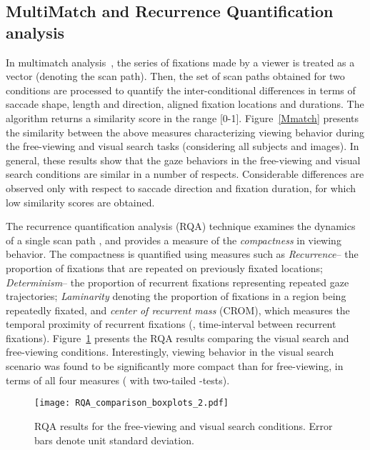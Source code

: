 \documentclass{article}
\begin{document}
\subsection{MultiMatch and Recurrence Quantification analysis}
In multimatch analysis~\cite{Dewhurst}, the series of fixations made by a viewer is treated as a vector (denoting the scan path). Then, the set of scan paths obtained for two conditions are processed to quantify the inter-conditional differences in terms of saccade shape, length and direction, aligned fixation locations and durations. The algorithm returns a similarity score in the range [0-1]. Figure~\ref{Mmatch} presents the similarity between the above measures characterizing viewing behavior during the free-viewing and visual search tasks (considering all subjects and images). In general, these results show that the gaze behaviors in the free-viewing and visual search conditions are similar in a number of respects. Considerable differences are observed only with respect to saccade direction and fixation duration, for which low similarity scores are obtained. 





The recurrence quantification analysis (RQA) technique examines the dynamics of a single scan path \cite{Anderson}, and provides a measure of the \textit{compactness} in viewing behavior. The compactness is quantified using measures such as \textit{Recurrence}-- the proportion of fixations that are repeated on previously fixated locations; \textit{Determinism}-- the proportion of recurrent fixations representing repeated gaze trajectories; \textit{Laminarity} denoting the proportion of fixations in a region being repeatedly fixated, and \textit{center of recurrent mass} (CROM), which measures the temporal proximity of recurrent fixations (\ie, time-interval between recurrent fixations). Figure~\ref{fig:RQA} presents the RQA results comparing the visual search and free-viewing conditions. Interestingly, viewing behavior in the visual search scenario was found to be significantly more compact than for free-viewing, in terms of all four measures ( with two-tailed -tests). 

\begin{figure}[htbp]
\texttt{[image: RQA\_comparison\_boxplots\_2.pdf]}\vspace{-0.02in}
\caption{RQA results for the free-viewing and visual search conditions. Error bars denote unit standard deviation.}
\label{fig:RQA}
\end{figure}
\end{document}
